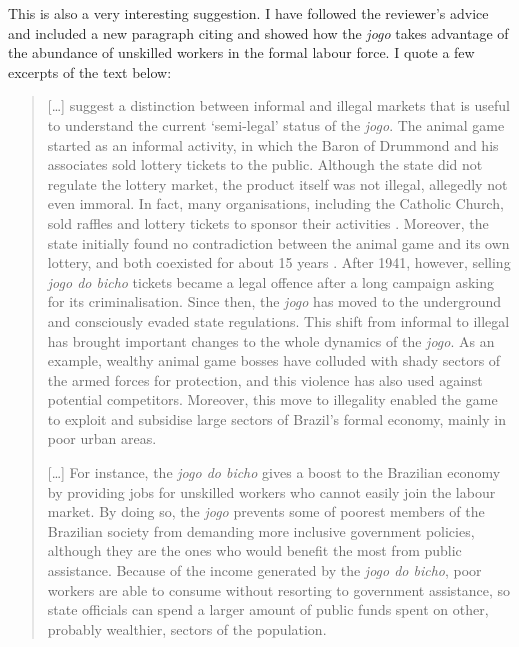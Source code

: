\documentclass[a4paper,12pt]{article}
\begin{document}
\vspace{.25cm}

This is also a very interesting suggestion. I have followed the reviewer's advice and included a new paragraph citing \citet{cross2006risk} and showed how the \textit{jogo} takes advantage of the abundance of unskilled workers in the formal labour force. I quote a few excerpts of the text below: 

\begin{quote}
	[\dots]  \citet{cross2006risk} suggest a distinction between informal and illegal markets that is useful to understand the current `semi-legal' status of the \textit{jogo}. The animal game started as an informal activity, in which the Baron of Drummond and his associates sold lottery tickets to the public. Although the state did not regulate the lottery market, the product itself was not illegal, allegedly not even immoral. In fact, many organisations, including the Catholic Church, sold raffles and lottery tickets to sponsor their activities \citep[49]{torcato2011repressao}. Moreover, the state initially found no contradiction between the animal game and its own lottery, and both coexisted for about 15 years \citep[559]{chazkel2007beyond}. After 1941, however, selling \textit{jogo do bicho} tickets became a legal offence after a long campaign asking for its criminalisation. Since then, the \textit{jogo} has moved to the underground and consciously evaded state regulations. This shift from informal to illegal has brought important changes to the whole dynamics of the \textit{jogo}. As an example, wealthy animal game bosses have colluded with shady sectors of the armed forces for protection, and this violence has also used against potential competitors. Moreover, this move to illegality enabled the game to exploit and subsidise large sectors of Brazil's formal economy, mainly in poor urban areas.

	[\dots] For instance, the \textit{jogo do bicho} gives a boost to the Brazilian economy by providing jobs for unskilled workers who cannot easily join the labour market. By doing so, the \textit{jogo} prevents some of poorest members of the Brazilian society from demanding more inclusive government policies, although they are the ones who would benefit the most from public assistance. Because of the income generated by the \textit{jogo do bicho}, poor workers are able to consume without resorting to government assistance, so state officials can spend a larger amount of public funds spent on other, probably wealthier, sectors of the population.


\end{quote}
\end{document}
